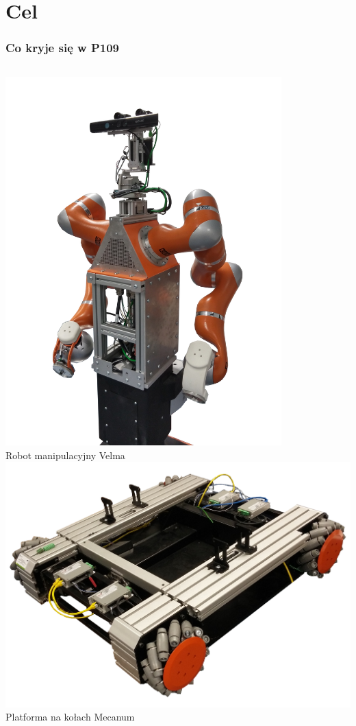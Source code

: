 \documentclass{beamer}
\begin{document}
	\section{Cel}
	\begin{frame}
		\frametitle{Co kryje się w P109}
		\begin{columns}[c]
			\includegraphics[width=0.8\textwidth]{graphics/velma.png} \\
			Robot manipulacyjny Velma
			\includegraphics[width=\textwidth]{graphics/omnivelma.png} \\
			Platforma na kołach Mecanum
		\end{columns}
	\end{frame}
\end{document}
